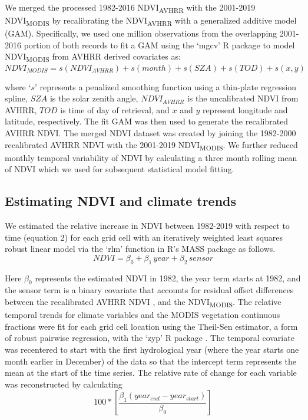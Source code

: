 \documentclass[gc, manuscript]{copernicus}
\begin{document}
We merged the processed 1982-2016 NDVI\textsubscript{AVHRR} with the
2001-2019 NDVI\textsubscript{MODIS} by recalibrating the
NDVI\textsubscript{AVHRR} with a generalized additive model (GAM).
Specifically, we used one million observations from the overlapping
2001-2016 portion of both records to fit a GAM using the `mgcv' R
package \citep{woodGeneralizedAdditiveModels2017b} to model
NDVI\textsubscript{MODIS} from AVHRR derived covariates as:
\begin{equation}
NDVI_{MODIS} = s(NDVI_{AVHRR})+s(month) + s(SZA) + s(TOD) + s(x,y)
\end{equation}

where `\(s\)' represents a penalized smoothing function using a
thin-plate regression spline, \(SZA\) is the solar zenith angle,
\(NDVI_{AVHRR}\) is the uncalibrated NDVI from AVHRR, \(TOD\) is time of
day of retrieval, and \(x\) and \(y\) represent longitude and latitude,
respectively. The fit GAM was then used to generate the recalibrated
AVHRR NDVI. The merged NDVI dataset was created by joining the 1982-2000
recalibrated AVHRR NDVI with the 2001-2019 NDVI\textsubscript{MODIS}. We
further reduced monthly temporal variability of NDVI by calculating a
three month rolling mean of NDVI which we used for subsequent
statistical model fitting.

\subsection{Estimating NDVI and climate trends}

We estimated the relative increase in NDVI between 1982-2019 with
respect to time (equation 2) for each grid cell with an iteratively
weighted least squares robust linear model via the `rlm' function in R's
MASS package \citep{venablesModernAppliedStatistics2002} as follows.
\begin{equation}
NDVI=\beta_0+ \beta_1\,year+\beta_2\,sensor
\end{equation}

Here \(\beta_0\) represents the estimated NDVI in 1982, the year term
starts at 1982, and the sensor term is a binary covariate that accounts
for residual offset differences between the recalibrated AVHRR NDVI ,
and the NDVI\textsubscript{MODIS}. The relative temporal trends for
climate variables and the MODIS vegetation continuous fractions were fit
for each grid cell location using the Theil-Sen estimator, a form of
robust pairwise regression, with the `zyp' R package
\citep{bronaughZypZhangYuePilon2019}. The temporal covariate was
recentered to start with the first hydrological year (where the year
starts one month earlier in December) of the data so that the intercept
term represents the mean at the start of the time series. The relative
rate of change for each variable was reconstructed by calculating
\begin{equation}
100*[\frac{\beta_1(year_{end}-year_{start})}{\beta_0}]
\end{equation}
\end{document}
